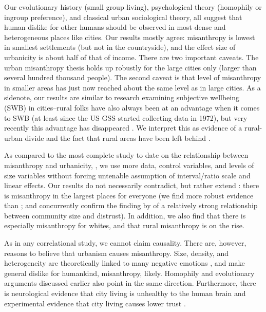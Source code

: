 \documentclass[10pt, letterpaper]{article}
\begin{document}
\begin{spacing}{1.4}
Our evolutionary history (small group living),  psychological theory (homophily or ingroup preference), and classical urban sociological theory, all 
suggest that human dislike for other humans should be observed in most dense and
heterogeneous places like cities. Our results mostly agree: misanthropy is
lowest in smallest settlements (but not in the countryside), and the effect size
of urbanicity is about half of that of income.
%
There are two important caveats. The urban misanthropy thesis holds up robustly for
the large cities only (larger than several hundred thousand people). The second
caveat is that level of misanthropy in smaller areas has just now reached about
the same level as in large cities.  
% 
%
As a sidenote, our results are  similar to research examining subjective wellbeing (SWB) in cities--rural folks have also
always been at an advantage when it comes to SWB (at least since the US GSS
started collecting data in 1972), but very recently this advantage has disappeared \citep{aok-swbGenYcity18}. We interpret this as evidence of a rural-urban divide and the fact that rural areas have been left behind \citep[e.g.,][]{fullerNYT17monD, hansonCityJournalautumn15}.

As compared to the most complete study to date on the relationship between
misanthropy and urbanicity, \citet{wilson85}, we use more data, control variables, and levels of size variables without forcing untenable assumption of interval/ratio scale and linear effects. Our results do not necessarily contradict, but rather extend \citet{wilson85}: there is misanthropy in the largest places for everyone (we find more robust evidence than \citet{wilson85}; and concurrently confirm the finding by \citet{fischer81} of a relatively strong relationship between community size and distrust). In addition, we also find that there is especially misanthropy for whites, and that rural misanthropy is on the rise.

As in any correlational study, we cannot claim causality. There are, however, reasons to believe that urbanism causes misanthropy. Size, density, and
heterogeneity are theoretically linked to many negative emotions
\citep{wirth38}, and make general dislike for humankind, misanthropy,
likely. Homophily and evolutionary arguments discussed earlier also point in the same direction. 
Furthermore, there is neurological evidence that city living is unhealthy to the human brain \citep{lederbogen11} and experimental evidence that city living causes lower trust \citep{milgram70}.


\end{spacing}
\end{document}
